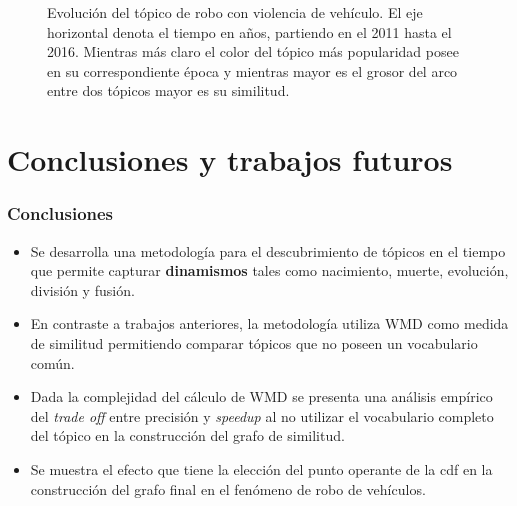 \documentclass[
	spanish, %
	aspectratio=43, %
	hyperref={pdfencoding=auto,psdextra},
	xcolor={dvipsnames,table,usenames},
]{beamer}
\begin{document}
\begin{frame}
\begin{figure}
\caption{Evolución del tópico de robo con violencia de vehículo. El eje horizontal denota el tiempo en años, partiendo en el 2011 hasta el 2016. Mientras más claro el color del tópico más popularidad posee en su correspondiente época y mientras mayor es el grosor del arco entre dos tópicos mayor es su similitud.}
\label{img:violence_topic}
\end{figure}

\end{frame}


\section{Conclusiones y trabajos futuros}

\begin{frame}
\frametitle{Conclusiones}

\begin{itemize}
  \item Se desarrolla una metodología para el descubrimiento de tópicos en el tiempo que permite capturar \textbf{dinamismos} tales como nacimiento, muerte, evolución, división y fusión.
  \item En contraste a trabajos anteriores, la metodología utiliza WMD como medida de similitud permitiendo comparar tópicos que no poseen un vocabulario común.
  \item Dada la complejidad del cálculo de WMD se presenta una análisis empírico del \textit{trade off} entre precisión y \textit{speedup} al no utilizar el vocabulario completo del tópico en la construcción del grafo de similitud.
  \item Se muestra el efecto que tiene la elección del punto operante de la cdf en la construcción del grafo final en el fenómeno de robo de vehículos. 
\end{itemize}

\end{frame}
\end{document}
